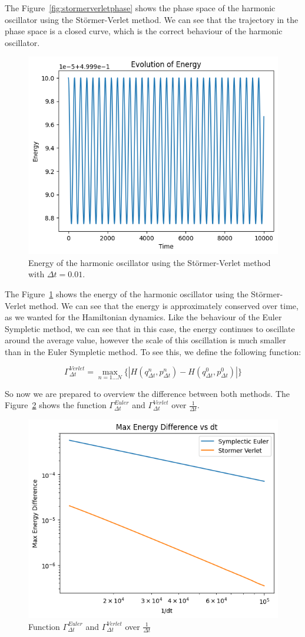 \documentclass{report}
\begin{document}
The Figure~\ref{fig:stormerverletphase} shows the phase space of the harmonic oscillator using the Störmer-Verlet method. We can see that the trajectory in the phase space is a closed curve, which is the correct behaviour of the harmonic oscillator.

\begin{figure}[H]
	\centering
	\includegraphics[width=0.5\linewidth]{./Figures/Sympletic/verletenergy.png}
	\caption{Energy of the harmonic oscillator using the Störmer-Verlet method with \(\Delta t = 0.01\).}
	\label{fig:stormerverletenergy}
\end{figure}

The Figure~\ref{fig:stormerverletenergy} shows the energy of the harmonic oscillator using the Störmer-Verlet method. We can see that the energy is approximately conserved over time, as we wanted for the Hamiltonian dynamics. Like the behaviour of the Euler Sympletic method, we can see that in this case, the energy continues to oscillate around the average value, however the scale of this oscillation is much smaller than in the Euler Sympletic method. To see this, we define the following function:

\[
	\Gamma_{\Delta t}^{Verlet} = \max_{n = 1 ... N}\{|H(q^n_{\Delta t}, p^n_{\Delta t}) - H(q^0_{\Delta t}, p^0_{\Delta t})|\}
\]

So now we are prepared to overview the difference between both methods. The Figure~\ref*{fig:comparisonmaxenergy} shows the function \(\Gamma_{\Delta t}^{Euler}\) and \(\Gamma_{\Delta t}^{Verlet}\) over \(\frac{1}{\Delta t}\).

\begin{figure}[H]
	\centering
	\includegraphics[width=0.5\linewidth]{./Figures/Sympletic/maxenergydifference.png}
	\caption{Function \(\Gamma_{\Delta t}^{Euler}\) and \(\Gamma_{\Delta t}^{Verlet}\) over \(\frac{1}{\Delta t}\)}
	\label{fig:comparisonmaxenergy}
\end{figure}
\end{document}
